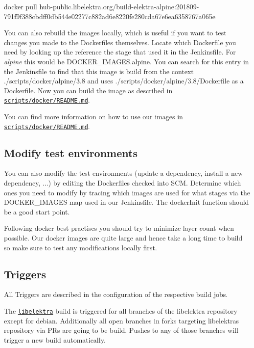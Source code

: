 \begin{DoxyCode}
docker pull
       hub-public.libelektra.org/build-elektra-alpine:201809-791f9f388cbdff0db544e02277c882ad6e8220fe280cda67e6ea6358767a065e
\end{DoxyCode}


You can also rebuild the images locally, which is useful if you want to test changes you made to the Dockerfiles themselves. Locate which Dockerfile you need by looking up the reference the stage that used it in the Jenkinsfile. For {\itshape alpine} this would be {\ttfamily D\+O\+C\+K\+E\+R\+\_\+\+I\+M\+A\+G\+E\+S.\+alpine}. You can search for this entry in the Jenkinsfile to find that this image is build from the context {\ttfamily ./scripts/docker/alpine/3.8} and uses {\ttfamily ./scripts/docker/alpine/3.8/\+Dockerfile} as a Dockerfile. Now you can build the image as described in \href{https://master.libelektra.org/scripts/docker/README.md#building-images-locally}{\tt scripts/docker/\+R\+E\+A\+D\+M\+E.\+md}.

You can find more information on how to use our images in \href{https://master.libelektra.org/scripts/docker/README.md#testing-elektra-via-docker-images}{\tt scripts/docker/\+R\+E\+A\+D\+M\+E.\+md}.

\subsection*{Modify test environments}

You can also modify the test environments (update a dependency, install a new dependency, ...) by editing the Dockerfiles checked into S\+CM. Determine which ones you need to modify by tracing which images are used for what stages via the {\ttfamily D\+O\+C\+K\+E\+R\+\_\+\+I\+M\+A\+G\+ES} map used in our Jenkinsfile. The {\ttfamily docker\+Init} function should be a good start point.

Following docker best practises you should try to minimize layer count when possible. Our docker images are quite large and hence take a long time to build so make sure to test any modifications locally first.

\subsection*{Triggers}

All Triggers are described in the configuration of the respective build jobs.

The \href{https://build.libelektra.org/jenkins/job/libelektra/}{\tt libelektra} build is triggered for all branches of the libelektra repository except for {\ttfamily debian}. Additionally all open branches in forks targeting libelektra\textquotesingle{}s repository via P\+Rs are going to be build. Pushes to any of those branches will trigger a new build automatically.

